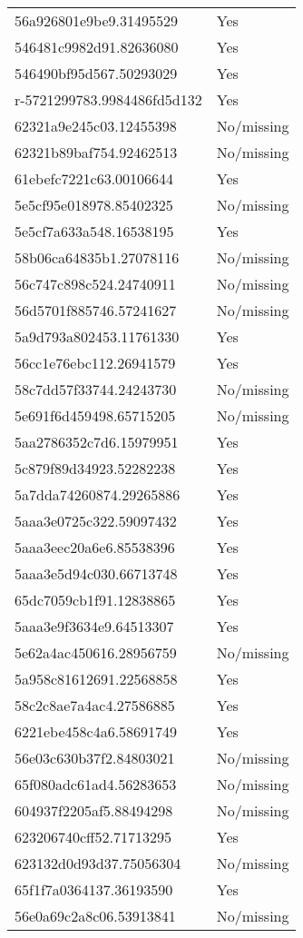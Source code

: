 \begin{tabular}{ll}
56a926801e9be9.31495529 & Yes \\
546481c9982d91.82636080 & Yes \\
546490bf95d567.50293029 & Yes \\
r-5721299783.9984486fd5d132 & Yes \\
62321a9e245c03.12455398 & No/missing \\
62321b89baf754.92462513 & No/missing \\
61ebefc7221c63.00106644 & Yes \\
5e5cf95e018978.85402325 & No/missing \\
5e5cf7a633a548.16538195 & Yes \\
58b06ca64835b1.27078116 & No/missing \\
56c747c898c524.24740911 & No/missing \\
56d5701f885746.57241627 & No/missing \\
5a9d793a802453.11761330 & Yes \\
56cc1e76ebc112.26941579 & Yes \\
58c7dd57f33744.24243730 & No/missing \\
5e691f6d459498.65715205 & No/missing \\
5aa2786352c7d6.15979951 & Yes \\
5c879f89d34923.52282238 & Yes \\
5a7dda74260874.29265886 & Yes \\
5aaa3e0725c322.59097432 & Yes \\
5aaa3eec20a6e6.85538396 & Yes \\
5aaa3e5d94c030.66713748 & Yes \\
65dc7059cb1f91.12838865 & Yes \\
5aaa3e9f3634e9.64513307 & Yes \\
5e62a4ac450616.28956759 & No/missing \\
5a958c81612691.22568858 & Yes \\
58c2c8ae7a4ac4.27586885 & Yes \\
6221ebe458c4a6.58691749 & Yes \\
56e03c630b37f2.84803021 & No/missing \\
65f080adc61ad4.56283653 & No/missing \\
604937f2205af5.88494298 & No/missing \\
623206740cff52.71713295 & Yes \\
623132d0d93d37.75056304 & No/missing \\
65f1f7a0364137.36193590 & Yes \\
56e0a69c2a8c06.53913841 & No/missing \\

\end{tabular}
